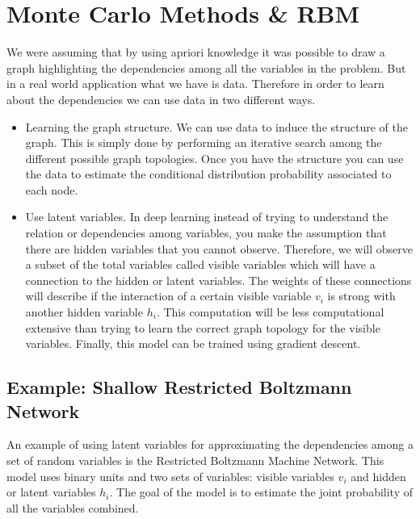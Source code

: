 \chapter{Monte Carlo Methods \& RBM}

We were assuming that by using apriori knowledge it was possible to draw a graph highlighting the dependencies among all the variables in the problem. But in a real world application what we have is data. Therefore in order to learn about the dependencies we can use data in two different ways.

\begin{itemize}
    \item Learning the graph structure. We can use data to induce the structure of the graph. This is simply done by performing an iterative search among the different possible graph topologies. Once you have the structure you can use the data to estimate the conditional distribution probability associated to each node.

    \item Use latent variables. In deep learning instead of trying to understand the relation or dependencies among variables, you make the assumption that there are hidden variables that you cannot observe. Therefore, we will observe a subset of the total variables called visible variables which will have a connection to the hidden or latent variables. The weights of these connections will describe if the interaction of a certain visible variable $v_i$ is strong with another hidden variable $h_i$. This computation will be less computational extensive than trying to learn the correct graph topology for the visible variables. Finally, this model can be trained using gradient descent.
\end{itemize}


\section{Example: Shallow Restricted Boltzmann Network}
An example of using latent variables for approximating the dependencies among a set of random variables is the Restricted Boltzmann Machine Network. This model uses binary units and two sets of variables: visible variables $v_i$ and hidden or latent variables $h_i$. The goal of the model is to estimate the joint probability of all the variables combined.

